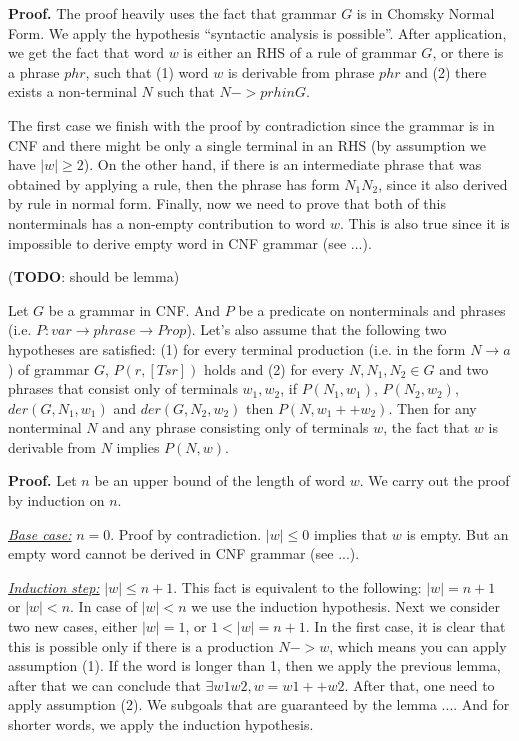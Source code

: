 \textbf{Proof.}
The proof heavily uses the fact that grammar $G$ is in Chomsky Normal Form.
We apply the hypothesis ``syntactic analysis is possible''. After application, we get the fact that word $w$ is either an RHS of a rule of grammar $G$, or there is a phrase $phr$, such that (1) word $w$ is derivable from phrase $phr$ and (2) there exists a non-terminal $N$ such that $N -> prh in G$.

The first case we finish with the proof by contradiction since the grammar is in CNF and there might be only a single terminal in an RHS (by assumption we have $|w| \ge 2$).
On the other hand, if there is an intermediate phrase that was obtained by applying a rule, then the phrase has form $N_1 N_2$, since it also derived by rule in normal form.
Finally, now we need to prove that both of this nonterminals has a non-empty contribution to word $w$. This is also true since it is impossible to derive empty word in CNF grammar (see ...).

(\textbf{TODO}: should be lemma)
\begin{theorem}
	Let $G$ be a grammar in CNF. And $P$ be a predicate on nonterminals and phrases (i.e. $P: var \to phrase \to Prop$).
	Let's also assume that the following two hypotheses are satisfied:
	(1) for every terminal production (i.e. in the form $N \to a$) of grammar $G$, $P(r, [Ts r])$ holds and (2) for every $N, N_1, N_2 \in G$ and two phrases that consist only of terminals $w_1, w_2$, if $P(N_1, w_1)$, $P(N_2, w_2)$, $der(G, N_1, w_1)$ and $der(G, N_2, w_2)$ then $P(N, w_1 ++ w_2)$.
	Then for any nonterminal $N$ and any phrase consisting only of terminals $w$, the fact that $w$ is derivable from $N$ implies $P(N,w)$.
\end{theorem}

\textbf{Proof.} 
Let $n$ be an upper bound of the length of word $w$. We carry out the proof by induction on $n$.

\underline{\textit{Base case:}} $ n = 0 $. Proof by contradiction. $|w| \le 0$ implies that $w$ is empty. But an empty word cannot be derived in CNF grammar (see ...).


\underline{\textit{Induction step:}} $|w| \le n+1$. This fact is equivalent to the following:  $|w| = n+1$ or $|w| < n$. 
In case of $|w| < n$ we use the induction hypothesis.
Next we consider two new cases, either $|w| = 1 $, or $1 < |w| = n + 1$.
In the first case, it is clear that this is possible only if there is a production $N -> w$, which means you can apply assumption (1).
If the word is longer than 1, then we apply the previous lemma, after that we can conclude that $\exists w1 w2, w = w1 ++ w2$. After that,
one need to apply assumption (2). We subgoals that are guaranteed by the lemma .... And for shorter words, we apply the induction hypothesis.

